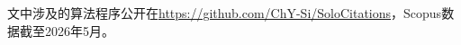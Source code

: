 \documentclass[12pt,hyperref,a4paper,UTF8]{ctexart}
\begin{document}






















文中涉及的算法程序公开在\url{https://github.com/ChY-Si/SoloCitations}，Scopus数据截至2026年5月。
\end{document}
